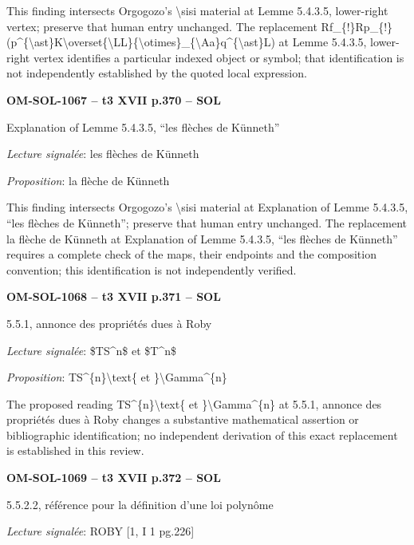 This finding intersects Orgogozo's \textbackslash{}sisi material at Lemme 5.4.3.5, lower-right vertex; preserve that human entry unchanged. The replacement Rf\_\{!\}Rp\_\{!\}(p\textasciicircum{}\{\textbackslash{}ast\}K\textbackslash{}overset\{\textbackslash{}LL\}\{\textbackslash{}otimes\}\_\{\textbackslash{}Aa\}q\textasciicircum{}\{\textbackslash{}ast\}L) at Lemme 5.4.3.5, lower-right vertex identifies a particular indexed object or symbol; that identification is not independently established by the quoted local expression.\par
\par\noindent\textbf{OM-SOL-1067 -- t3 XVII p.370 -- SOL}\par
Explanation of Lemme 5.4.3.5, “les flèches de Künneth”\par
\emph{Lecture signalée}: les flèches de Künneth\par
\emph{Proposition}: la flèche de Künneth\par
This finding intersects Orgogozo's \textbackslash{}sisi material at Explanation of Lemme 5.4.3.5, “les flèches de Künneth”; preserve that human entry unchanged. The replacement la flèche de Künneth at Explanation of Lemme 5.4.3.5, “les flèches de Künneth” requires a complete check of the maps, their endpoints and the composition convention; this identification is not independently verified.\par
\par\noindent\textbf{OM-SOL-1068 -- t3 XVII p.371 -- SOL}\par
5.5.1, annonce des propriétés dues à Roby\par
\emph{Lecture signalée}: \$TS\textasciicircum{}n\$ et \$T\textasciicircum{}n\$\par
\emph{Proposition}: TS\textasciicircum{}\{n\}\textbackslash{}text\{ et \}\textbackslash{}Gamma\textasciicircum{}\{n\}\par
The proposed reading TS\textasciicircum{}\{n\}\textbackslash{}text\{ et \}\textbackslash{}Gamma\textasciicircum{}\{n\} at 5.5.1, annonce des propriétés dues à Roby changes a substantive mathematical assertion or bibliographic identification; no independent derivation of this exact replacement is established in this review.\par
\par\noindent\textbf{OM-SOL-1069 -- t3 XVII p.372 -- SOL}\par
5.5.2.2, référence pour la définition d'une loi polynôme\par
\emph{Lecture signalée}: ROBY [1, I 1 pg.226]\par
